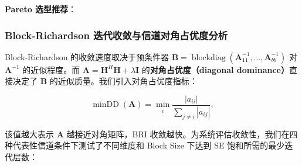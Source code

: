     \textbf{Pareto 选型推荐}：

    \subsubsection{Block-Richardson 迭代收敛与信道对角占优度分析}

    Block-Richardson 的收敛速度取决于预条件器 $\bm{B}=\operatorname{blockdiag}(\bm
    {A}_{11}^{-1},\dots,\bm{A}_{bb}^{-1})$ 对 $\bm{A}^{-1}$ 的近似程度。而 $\bm{A}
    =\bm{H}^{H}\bm{H}+\lambda\bm{I}$ 的\textbf{对角占优度（diagonal dominance）}直接决定了
    $\bm{B}$ 的近似质量。我们引入对角占优度指标：

    \begin{equation}
        \operatorname{minDD}(\bm{A}) = \min_{i}\frac{|a_{ii}|}{\sum_{j\neq i}|a_{ij}|}
        ,
    \end{equation}

    该值越大表示 $\bm{A}$ 越接近对角矩阵，BRI
    收敛越快。为系统评估收敛性，我们在四种代表性信道条件下测试了不同维度和 Block
    Size 下达到 SE 饱和所需的最少迭代层数：

